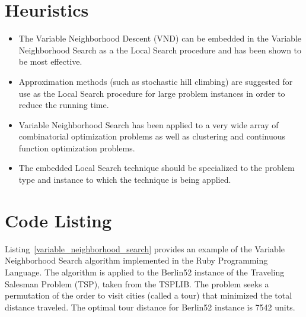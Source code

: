 \documentclass[a4paper, 11pt]{article}
\begin{document}
\section{Heuristics}
\label{sec:heuristics}
\begin{itemize}
	\item The Variable Neighborhood Descent (VND) can be embedded in the Variable Neighborhood Search as a the Local Search procedure and has been shown to be most effective. 
	\item Approximation methods (such as stochastic hill climbing) are suggested for use as the Local Search procedure for large problem instances in order to reduce the running time.
	\item Variable Neighborhood Search has been applied to a very wide array of combinatorial optimization problems as well as clustering and continuous function optimization problems.
	\item The embedded Local Search technique should be specialized to the problem type and instance to which the technique is being applied. 
\end{itemize}

\section{Code Listing}
\label{sec:code}
Listing~\ref{variable_neighborhood_search} provides an example of the Variable Neighborhood Search algorithm implemented in the Ruby Programming Language. 
The algorithm is applied to the Berlin52 instance of the Traveling Salesman Problem (TSP), taken from the TSPLIB. The problem seeks a permutation of the order to visit cities (called a tour) that minimized the total distance traveled. The optimal tour distance for Berlin52 instance is 7542 units.
\end{document}

